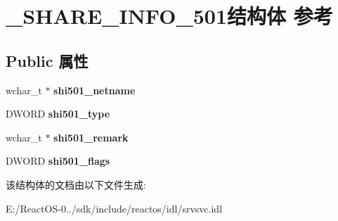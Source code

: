 \hypertarget{struct___s_h_a_r_e___i_n_f_o__501}{}\section{\+\_\+\+S\+H\+A\+R\+E\+\_\+\+I\+N\+F\+O\+\_\+501结构体 参考}
\label{struct___s_h_a_r_e___i_n_f_o__501}
\subsection*{Public 属性}
\begin{DoxyCompactItemize}
\item 
\mbox{\label{struct___s_h_a_r_e___i_n_f_o__501_a73fbcae41a250509e94171ce4b605c93}} 
wchar\+\_\+t $\ast$ {\bfseries shi501\+\_\+netname}
\item 
\mbox{\label{struct___s_h_a_r_e___i_n_f_o__501_ac28ab00a9deae39564b4a7bfc9d5fd12}} 
D\+W\+O\+RD {\bfseries shi501\+\_\+type}
\item 
\mbox{\label{struct___s_h_a_r_e___i_n_f_o__501_adf60f38715e51447d2a2a32b8fd7e3ee}} 
wchar\+\_\+t $\ast$ {\bfseries shi501\+\_\+remark}
\item 
\mbox{\label{struct___s_h_a_r_e___i_n_f_o__501_a2da50317e84515a04f75ab1aeb5a96f4}} 
D\+W\+O\+RD {\bfseries shi501\+\_\+flags}
\end{DoxyCompactItemize}


该结构体的文档由以下文件生成\+:\begin{DoxyCompactItemize}
\item 
E\+:/\+React\+O\+S-\/0../sdk/include/reactos/idl/srvsvc.\+idl\end{DoxyCompactItemize}
